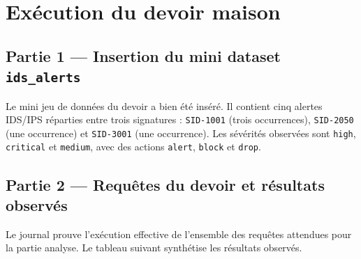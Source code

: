 \documentclass[11pt,a4paper]{article}
\begin{document}
\section{Exécution du devoir maison}

\subsection{Partie 1 --- Insertion du mini dataset \texttt{ids\_alerts}}

Le mini jeu de données du devoir a bien été inséré. Il contient cinq alertes IDS/IPS réparties entre trois signatures : \texttt{SID-1001} (trois occurrences), \texttt{SID-2050} (une occurrence) et \texttt{SID-3001} (une occurrence). Les sévérités observées sont \texttt{high}, \texttt{critical} et \texttt{medium}, avec des actions \texttt{alert}, \texttt{block} et \texttt{drop}.

\subsection{Partie 2 --- Requêtes du devoir et résultats observés}

Le journal prouve l'exécution effective de l'ensemble des requêtes attendues pour la partie analyse. Le tableau suivant synthétise les résultats observés.
\end{document}

